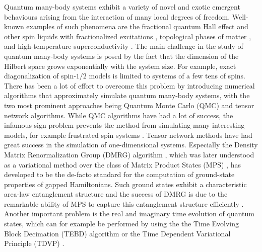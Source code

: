 Quantum many-body systems exhibit a variety of novel and exotic emergent behaviours arising from the interaction of many local degrees of freedom. Well-known examples of such phenomena are the fractional quantum Hall effect \cite{cite:two_dimensional_magnetotransport_in_the_extreme_quantum_limit, cite:anomalous_quantum_hall_effect_an_incompressible_quantum_fluid_with_fractionally_charged_excitations, cite:the_fractional_QHE} and other spin liquids with fractionalized excitations \cite{cite:fractionalized_excitations_in_the_spin_liquid_state_of_a_kagome_lattice_AFM}, topological phases of matter \cite{cite:colloqium_zoo_of_quantum_topological_phases_of_matter}, and high-temperature superconductivity \cite{cite:possible_high_T_c_superconductivity_in_the_Ba_La_Cu_O_system, cite:doping_a_mott_insulator_physics_of_high_temperature_superconductivity}. The main challenge in the study of quantum many-body systems is posed by the fact that the dimension of the Hilbert space grows exponentially with the system size. For example, exact diagonalization of spin-$1/2$ models is limited to systems of a few tens of spins. There has been a lot of effort to overcome this problem by introducing numerical algorithms that approximately simulate quantum many-body systems, with the two most prominent approaches being Quantum Monte Carlo (QMC) \cite{cite:quantum_monte_carlo_simulation_method_for_spin_systems, cite:computational_studies_of_quantum_spin_systems} and tensor network algorithms. While QMC algorithms have had a lot of success, the infamous sign problem prevents the method from simulating many interesting models, for example frustrated spin systems \cite{cite:computational_studies_of_quantum_spin_systems, cite:sign_problem_in_numerical_simulation_of_many_electron_systems}. Tensor network methods have had great success in the simulation of one-dimensional systems. Especially the Density Matrix Renormalization Group (DMRG) algorithm \cite{cite:density_matrix_formulation_for_quantum_renormalization_groups}, which was later understood as a variational method over the class of Matrix Product States (MPS) \cite{cite:equivalence_of_the_variational_mps_and_the_dmrg_applied_to_spin_chains, cite:DMRG_in_the_age_of_MPS, cite:practical_introduction_MPS_and_PEPS}, has developed to be the de-facto standard for the computation of ground-state properties of gapped Hamiltonians. Such ground states exhibit a characteristic area-law entanglement structure \cite{cite:area_law_1D_proof} and the success of DMRG is due to the remarkable ability of MPS to capture this entanglement structure efficiently \cite{cite:area_laws_review, cite:mps_represent_ground_states_faithfully}. Another important problem is the real and imaginary time evolution of quantum states, which can for example be performed by using the the Time Evolving Block Decimation (TEBD) \cite{cite:efficient_simulation_of_1D_quantum_many_body_systems} algorithm or the Time Dependent Variational Principle (TDVP) \cite{cite:time_dependent_variational_principle_for_quantum_lattices}.
